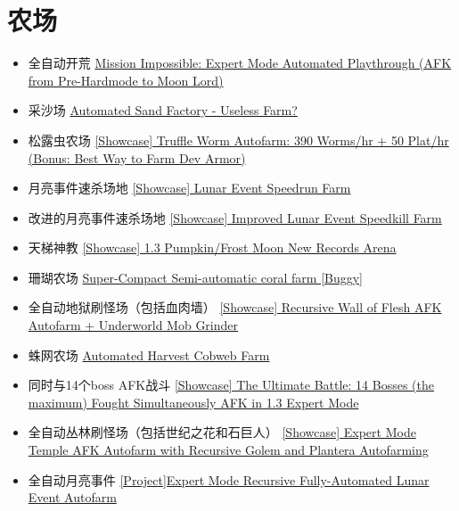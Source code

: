 \section{农场}
\begin{itemize}
\item 全自动开荒 \href{https://forums.terraria.org/index.php?threads/mission-impossible-expert-mode-automated-playthrough-afk-from-pre-hardmode-to-moon-lord.75870/}{Mission Impossible: Expert Mode Automated Playthrough (AFK from Pre-Hardmode to Moon Lord)}
\item 采沙场 \href{https://forums.terraria.org/index.php?threads/automated-sand-factory-useless-farm.75846/}{Automated Sand Factory - Useless Farm?}
\item 松露虫农场 \href{https://forums.terraria.org/index.php?threads/showcase-truffle-worm-autofarm-390-worms-hr-50-plat-hr-bonus-best-way-to-farm-dev-armor.75848/}{[Showcase] Truffle Worm Autofarm: 390 Worms/hr + 50 Plat/hr (Bonus: Best Way to Farm Dev Armor)}
\item 月亮事件速杀场地 \href{https://forums.terraria.org/index.php?threads/showcase-lunar-event-speedrun-farm.76080/}{[Showcase] Lunar Event Speedrun Farm}
\item 改进的月亮事件速杀场地 \href{https://forums.terraria.org/index.php?threads/showcase-improved-lunar-event-speedkill-farm.75968/}{[Showcase] Improved Lunar Event Speedkill Farm}
\item 天梯神教 \href{https://forums.terraria.org/index.php?threads/showcase-1-3-pumpkin-frost-moon-new-records-arena.75976/}{[Showcase] 1.3 Pumpkin/Frost Moon New Records Arena}
\item 珊瑚农场 \href{https://forums.terraria.org/index.php?threads/super-compact-semi-automatic-coral-farm-buggy.76772/}{Super-Compact Semi-automatic coral farm [Buggy]}
\item 全自动地狱刷怪场（包括血肉墙） \href{https://forums.terraria.org/index.php?threads/showcase-recursive-wall-of-flesh-afk-autofarm-underworld-mob-grinder.75885/}{[Showcase] Recursive Wall of Flesh AFK Autofarm + Underworld Mob Grinder}
\item 蛛网农场 \href{https://forums.terraria.org/index.php?threads/automated-harvest-cobweb-farm.76865/}{Automated Harvest Cobweb Farm}
\item 同时与14个boss AFK战斗 \href{https://forums.terraria.org/index.php?threads/showcase-the-ultimate-battle-14-bosses-the-maximum-fought-simultaneously-afk-in-1-3-expert-mode.75897/}{[Showcase] The Ultimate Battle: 14 Bosses (the maximum) Fought Simultaneously AFK in 1.3 Expert Mode}
\item 全自动丛林刷怪场（包括世纪之花和石巨人） \href{https://forums.terraria.org/index.php?threads/showcase-expert-mode-temple-afk-autofarm-with-recursive-golem-and-plantera-autofarming.75900/}{[Showcase] Expert Mode Temple AFK Autofarm with Recursive Golem and Plantera Autofarming}
\item 全自动月亮事件 \href{https://forums.terraria.org/index.php?threads/project-expert-mode-recursive-fully-automated-lunar-event-autofarm.75902/}{[Project]Expert Mode Recursive Fully-Automated Lunar Event Autofarm}
\end{itemize}

